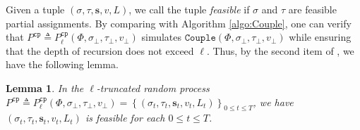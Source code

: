 \documentclass[11pt]{article}
\newtheorem{lemma}[theorem]{Lemma}
\newcommand{\set}[1]{\left\{#1\right\}}
\def\!#1{\mathtt{#1}}
\newcommand{\seqS}{\boldsymbol{s}}
\begin{document}


Given a tuple $(\sigma,\tau,\seqS, v,L)$, we call the tuple \emph{feasible} if $\sigma$ and $\tau$ are feasible partial assignments. By comparing  with Algorithm \ref{algo:Couple}, one can verify that $P^{\!{cp}} \triangleq P^{\!{cp}}_\ell(\Phi, \sigma_\bot, \tau_\bot, v_\bot)$ simulates $\!{Couple}(\Phi, \sigma_\bot, \tau_\bot, v_\bot)$ while ensuring that the depth of recursion does not exceed $\ell$.
Thus, by the second item of , we have the following lemma. 

\begin{lemma}\label{lemma-trp-correctness-feasible}
In the $\ell$-truncated random process $P^{\!{cp}} \triangleq P^{\!{cp}}_\ell(\Phi, \sigma_\bot, \tau_\bot, v_\bot) = \set{(\sigma_t, \tau_t, \seqS_t, v_t, L_t)}_{0\leq t \leq T}$, we have 
$(\sigma_t, \tau_t,\seqS_t, v_t, L_t)$ is feasible for each $0\leq t \leq T$.
\end{lemma}
\end{document}
